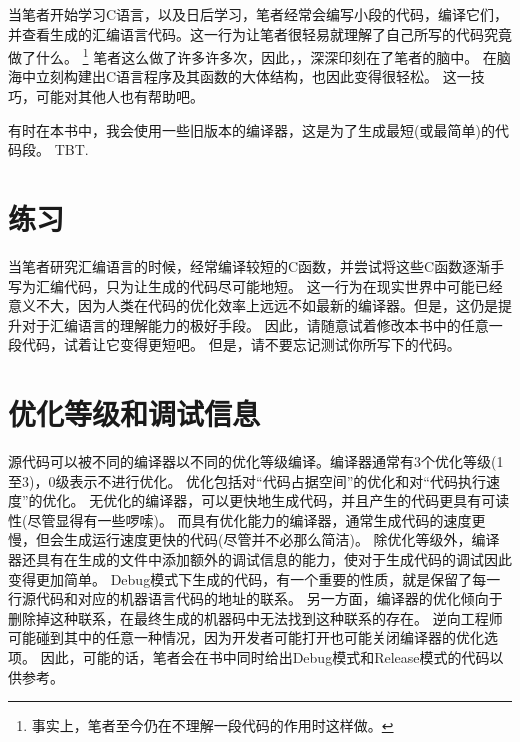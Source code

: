 
当笔者开始学习C语言，以及日后学习，笔者经常会编写小段的代码，编译它们，并查看生成的汇编语言代码。这一行为让笔者很轻易就理解了自己所写的代码究竟做了什么。
\footnote{事实上，笔者至今仍在不理解一段代码的作用时这样做。}
笔者这么做了许多许多次，因此，，深深印刻在了笔者的脑中。
在脑海中立刻构建出C语言程序及其函数的大体结构，也因此变得很轻松。
这一技巧，可能对其他人也有帮助吧。


有时在本书中，我会使用一些旧版本的编译器，这是为了生成最短(或最简单)的代码段。
\ac{TBT}.
\section*{练习}

当笔者研究汇编语言的时候，经常编译较短的C函数，并尝试将这些C函数逐渐手写为汇编代码，只为让生成的代码尽可能地短。
这一行为在现实世界中可能已经意义不大，因为人类在代码的优化效率上远远不如最新的编译器。但是，这仍是提升对于汇编语言的理解能力的极好手段。
因此，请随意试着修改本书中的任意一段代码，试着让它变得更短吧。
但是，请不要忘记测试你所写下的代码。

\section*{优化等级和调试信息}

源代码可以被不同的编译器以不同的优化等级编译。编译器通常有3个优化等级(1至3)，0级表示不进行优化。
优化包括对“代码占据空间”的优化和对“代码执行速度”的优化。
无优化的编译器，可以更快地生成代码，并且产生的代码更具有可读性(尽管显得有一些啰嗦)。
而具有优化能力的编译器，通常生成代码的速度更慢，但会生成运行速度更快的代码(尽管并不必那么简洁)。
除优化等级外，编译器还具有在生成的文件中添加额外的调试信息的能力，使对于生成代码的调试因此变得更加简单。
Debug模式下生成的代码，有一个重要的性质，就是保留了每一行源代码和对应的机器语言代码的地址的联系。
另一方面，编译器的优化倾向于删除掉这种联系，在最终生成的机器码中无法找到这种联系的存在。
逆向工程师可能碰到其中的任意一种情况，因为开发者可能打开也可能关闭编译器的优化选项。
因此，可能的话，笔者会在书中同时给出Debug模式和Release模式的代码以供参考。
